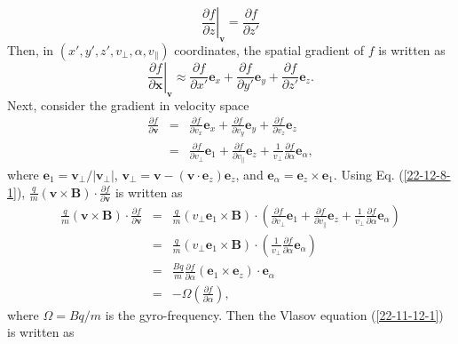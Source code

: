 \documentclass{llncs}
\begin{document}
\begin{equation}
  \left. \frac{\partial f}{\partial z} \right|_{\mathbf{v}} = \frac{\partial
  f}{\partial z'}
\end{equation}
Then, in $(x', y', z', v_{\perp}, \alpha, v_{\parallel})$ coordinates, the
spatial gradient of $f$ is written as
\begin{equation}
  \left. \frac{\partial f}{\partial \mathbf{x}} \right|_{\mathbf{v}} \approx
  \frac{\partial f}{\partial x'} \mathbf{e}_x + \frac{\partial f}{\partial y'}
  \mathbf{e}_y + \frac{\partial f}{\partial z'} \mathbf{e}_z .
\end{equation}
Next, consider the gradient in velocity space
\begin{eqnarray}
  \frac{\partial f}{\partial \mathbf{v}} & = & \frac{\partial f}{\partial v_x}
  \mathbf{e}_x + \frac{\partial f}{\partial v_y} \mathbf{e}_y + \frac{\partial
  f}{\partial v_z} \mathbf{e}_z \nonumber\\
  & = & \frac{\partial f}{\partial v_{\perp}} \mathbf{e}_1 + \frac{\partial
  f}{\partial v_{\parallel}} \mathbf{e}_z + \frac{1}{v_{\perp}} \frac{\partial
  f}{\partial \alpha} \mathbf{e}_{\alpha},  \label{22-12-8-1}
\end{eqnarray}
where $\mathbf{e}_1 =\mathbf{v}_{\perp} / | \mathbf{v}_{\perp} |$,
$\mathbf{v}_{\perp} =\mathbf{v}- (\mathbf{v} \cdot \mathbf{e}_z)
\mathbf{e}_z$, and $\mathbf{e}_{\alpha} =\mathbf{e}_z \times \mathbf{e}_1$.
Using Eq. (\ref{22-12-8-1}), $\frac{q}{m} (\mathbf{v} \times \mathbf{B}) \cdot
\frac{\partial f}{\partial \mathbf{v}}$ is written as
\begin{eqnarray}
  \frac{q}{m} (\mathbf{v} \times \mathbf{B}) \cdot \frac{\partial f}{\partial
  \mathbf{v}} & = & \frac{q}{m} (v_{\perp} \mathbf{e}_1 \times \mathbf{B})
  \cdot \left( \frac{\partial f}{\partial v_{\perp}} \mathbf{e}_1 +
  \frac{\partial f}{\partial v_{\parallel}} \mathbf{e}_z + \frac{1}{v_{\perp}}
  \frac{\partial f}{\partial \alpha} \mathbf{e}_{\alpha} \right) \nonumber\\
  & = & \frac{q}{m} (v_{\perp} \mathbf{e}_1 \times \mathbf{B}) \cdot \left(
  \frac{1}{v_{\perp}} \frac{\partial f}{\partial \alpha} \mathbf{e}_{\alpha}
  \right) \nonumber\\
  & = & \frac{B q}{m}  \frac{\partial f}{\partial \alpha}  (\mathbf{e}_1
  \times \mathbf{e}_z) \cdot \mathbf{e}_{\alpha} \nonumber\\
  & = & - \Omega \left( \frac{\partial f}{\partial \alpha} \right), 
\end{eqnarray}
where $\Omega = B q / m$ is the gyro-frequency. Then the Vlasov equation
(\ref{22-11-12-1}) is written as
\end{document}
